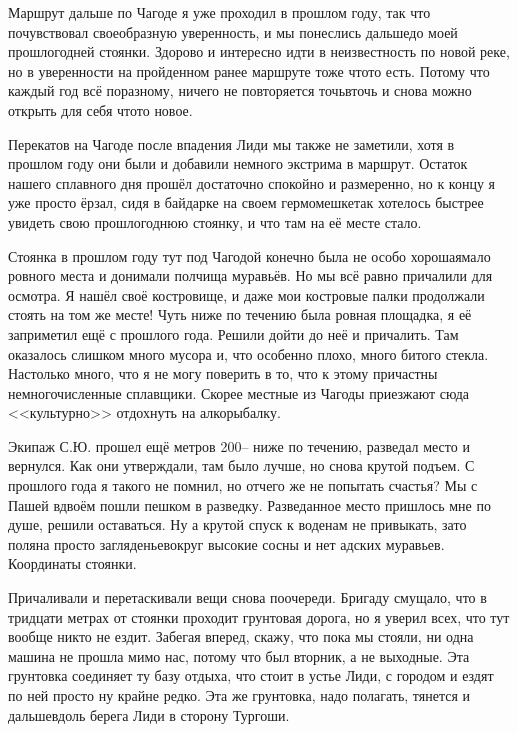 Маршрут дальше по Чагоде я уже проходил в прошлом году, так что почувствовал своеобразную уверенность, и мы понеслись дальше\mdash  до моей прошлогодней стоянки. Здорово и интересно идти в неизвестность по новой реке, но в уверенности на пройденном ранее маршруте тоже что\sdash то есть. Потому что каждый год всё по\sdash разному, ничего не повторяется точь\sdash в\sdash точь и снова можно открыть для себя что\sdash то новое. 
 
Перекатов на Чагоде после впадения Лиди мы также не заметили, хотя в прошлом году они были и добавили немного экстрима в маршрут. Остаток нашего сплавного дня прошёл достаточно спокойно и размеренно, но к концу я уже просто ёрзал, сидя в байдарке на своем гермомешке\mdash  так хотелось быстрее увидеть свою прошлогоднюю стоянку, и что там на её месте стало. 

Стоянка в прошлом году тут под Чагодой конечно была не особо хорошая\mdash  мало ровного места и донимали полчища муравьёв. Но мы всё равно причалили для осмотра. Я нашёл своё костровище, и даже мои костровые палки продолжали стоять на том же месте! Чуть ниже по течению была ровная площадка, я её заприметил ещё с прошлого года. Решили дойти до неё и причалить. Там оказалось слишком много мусора и, что особенно плохо, много битого стекла. Настолько много, что я не могу поверить в то, что к этому причастны немногочисленные сплавщики. Скорее местные из Чагоды приезжают сюда <<культурно>> отдохнуть на алкорыбалку. 

Экипаж С.Ю. прошел ещё метров 200\thinspace\nobreakdash-- ниже по течению, разведал место и вернулся. Как они утверждали, там было лучше, но снова крутой подъем. С прошлого года я такого не помнил, но отчего же не попытать счастья? Мы с Пашей вдвоём пошли пешком в разведку. Разведанное место пришлось мне по душе, решили оставаться. Ну а крутой спуск к воде\mdash  нам не привыкать, зато поляна просто загляденье\mdash  вокруг высокие сосны и нет адских муравьев. Координаты стоянки\mdash \CoordsChagodaSixteenDrunk.

Причаливали и перетаскивали вещи снова по\sdash очереди. Бригаду смущало, что в тридцати метрах от стоянки проходит грунтовая дорога, но я уверил всех, что тут вообще никто не ездит. Забегая вперед, скажу, что пока мы стояли, ни одна машина не прошла мимо нас, потому что был вторник, а не выходные. Эта грунтовка соединяет ту базу отдыха, что стоит в устье Лиди, с городом и ездят по ней просто ну крайне редко. Эта же грунтовка, надо полагать, тянется и дальше\mdash вдоль берега Лиди в сторону Тургоши.

